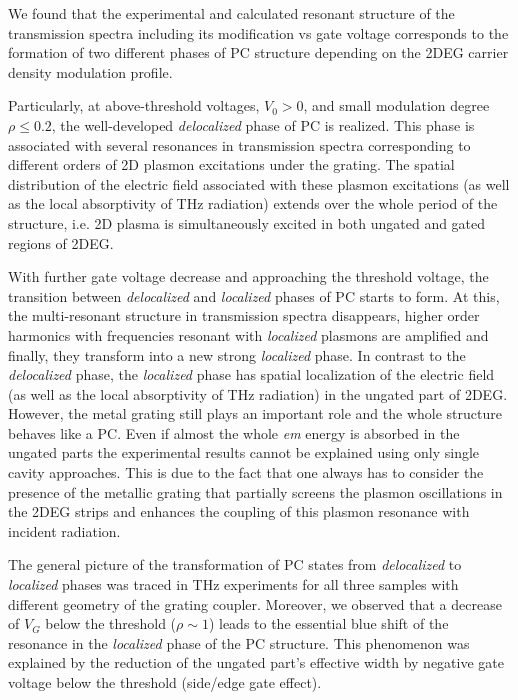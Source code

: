 \documentclass[%
 reprint,
 amsmath,amssymb,
 aps,
]{revtex4-2}
\begin{document}
We found that the experimental and calculated resonant structure of the transmission spectra including its modification vs gate voltage corresponds to the formation of two different phases of  PC structure depending on the 2DEG carrier density modulation profile.

Particularly, at above-threshold voltages, $V_0>0$, and small modulation degree $\rho\leq 0.2$, the well-developed \textit{ delocalized} phase of PC is realized. This phase is associated with several resonances in transmission spectra corresponding to different orders of 2D plasmon excitations under the grating. The spatial distribution of the electric field associated with these plasmon excitations (as well as the local absorptivity of THz radiation) extends over the whole period of the structure, i.e. 2D plasma is simultaneously excited in both ungated and gated regions of 2DEG. 

With further gate voltage decrease and approaching the threshold voltage, the transition between \textit{ delocalized} and \textit{ localized} phases of PC starts to form.
At this, the multi-resonant structure in transmission spectra disappears,
higher order harmonics with frequencies resonant with \textit{ localized} plasmons are amplified and finally, they transform into a new strong \textit{ localized} phase.
In contrast to the \textit{ delocalized} phase, the \textit{ localized} phase has spatial localization of the electric field (as well as the local absorptivity of THz radiation) in the ungated part of 2DEG. 
However, the metal grating still plays an important role and the whole structure behaves like a PC. Even if almost the whole \textit{ em} energy is absorbed in the ungated parts the experimental results cannot be explained using only single cavity approaches. 
This is due to the fact that one always has to consider the presence of the metallic grating that partially screens the plasmon oscillations in the 2DEG strips and enhances the coupling of this plasmon resonance with incident radiation.

The general picture of the transformation of PC states from \textit{ delocalized} to \textit{ localized} phases was traced in THz experiments for all three samples with different geometry of the grating coupler. Moreover, we observed that a decrease of $V_G$ below the threshold ($\rho\sim 1$) leads to the essential blue shift of the resonance in the \textit{ localized} phase of the PC structure. 
This phenomenon was explained by the reduction of the ungated part's effective width by negative gate voltage below the threshold (side/edge gate effect).
\end{document}
